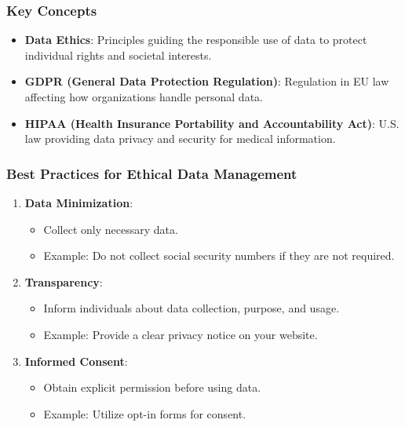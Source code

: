 \documentclass[aspectratio=169]{beamer}
\begin{document}
\begin{frame}[fragile]
    \frametitle{Key Concepts}
    \begin{itemize}
        \item \textbf{Data Ethics}: Principles guiding the responsible use of data to protect individual rights and societal interests.
        \item \textbf{GDPR (General Data Protection Regulation)}: Regulation in EU law affecting how organizations handle personal data.
        \item \textbf{HIPAA (Health Insurance Portability and Accountability Act)}: U.S. law providing data privacy and security for medical information.
    \end{itemize}
\end{frame}

\begin{frame}[fragile]
    \frametitle{Best Practices for Ethical Data Management}
    \begin{enumerate}
        \item \textbf{Data Minimization}:
            \begin{itemize}
                \item Collect only necessary data.
                \item Example: Do not collect social security numbers if they are not required.
            \end{itemize}
        \item \textbf{Transparency}:
            \begin{itemize}
                \item Inform individuals about data collection, purpose, and usage.
                \item Example: Provide a clear privacy notice on your website.
            \end{itemize}
        \item \textbf{Informed Consent}:
            \begin{itemize}
                \item Obtain explicit permission before using data.
                \item Example: Utilize opt-in forms for consent.
            \end{itemize}
    \end{enumerate}
\end{frame}
\end{document}
